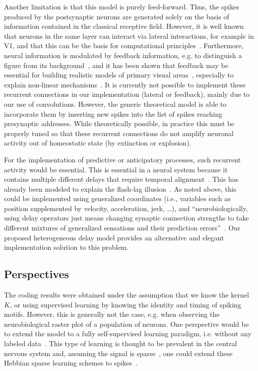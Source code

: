 \documentclass[runningheads]{llncs}
\newcommand{\kernel}{K} %
\begin{document}
Another limitation is that this model is purely feed-forward. Thus, the spikes produced by the postsynaptic neurons are generated solely on the basis of information contained in the classical receptive field. However, it is well known that neurons in the same layer can interact via lateral interactions, for example in V1, and that this can be the basis for computational principles~\cite{chavane_revisiting_2022}. Furthermore, neural information is modulated by feedback information, e.g. to distinguish a figure from its background~\cite{roelfsema_early_2016}, and it has been shown that feedback may be essential for building realistic models of primary visual areas~\cite{boutin_sparse_2020}, especially to explain non-linear mechanisms~\cite{boutin_effect_2020}. It is currently not possible to implement these recurrent connections in our implementation (lateral or feedback), mainly due to our use of convolutions. However, the generic theoretical model is able to incorporate them by inserting new spikes into the list of spikes reaching presynaptic addresses. While theoretically possible, in practice this must be properly tuned so that these recurrent connections do not amplify neuronal activity out of homeostatic state (by extinction or explosion).

For the implementation of predictive or anticipatory processes, such recurrent activity would be essential. This is essential in a neural system because it contains multiple different delays that require temporal alignment~\cite{hogendoorn_predictive_2019}. This has already been modeled to explain the flash-lag illusion~\cite{khoei_flash-lag_2017}. As noted above, this could be implemented using generalized coordinates (i.e., variables such as position supplemented by velocity, acceleration, jerk, \ldots), and ``neurobiologically, using delay operators just means changing synaptic connection strengths to take different mixtures of generalized sensations and their prediction errors''~\cite{perrinet_active_2014}. Our proposed heterogeneous delay model provides an alternative and elegant implementation solution to this problem.
%
\subsection{Perspectives}
The coding results were obtained under the assumption that we know the kernel $\kernel$, or using supervised learning by knowing the identity and timing of spiking motifs. However, this is generally not the case, e.g. when observing the neurobiological raster plot of a population of neurons. One perspective would be to extend the model to a fully self-supervised learning paradigm, i.e. without any labeled data~\cite{barlow_unsupervised_1989}. This type of learning is thought to be prevalent in the central nervous system and, assuming the signal is sparse~\cite{olshausen_emergence_1996}, one could extend these Hebbian sparse learning schemes to spikes~\cite{perrinet_emergence_2004,masquelier_competitive_2009}. 
\end{document}
